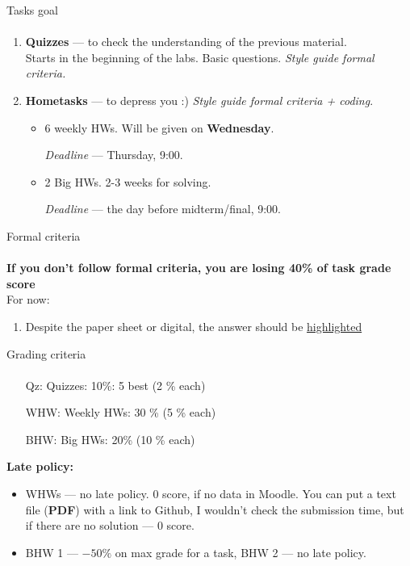 \documentclass[aspectratio=169,xcolor=table,10pt, notes=hide]{beamer}
\begin{document}
\begin{frame}[t]{Tasks goal}
    \framesubtitle{}
    \begin{enumerate}
        \item \textbf{Quizzes} — to check the understanding of the previous material.\\
              Starts in the beginning of the labs. Basic questions. \textit{Style guide formal criteria.}
        \item \textbf{Hometasks} — to depress you :) \textit{Style guide formal criteria + coding}.
        \begin{itemize}
            \item 6 weekly HWs. Will be given on \textbf{Wednesday}. 
            
            \textit{Deadline} --- Thursday, 9:00.
            \item 2 Big HWs. 2-3 weeks for solving. 
            
            \textit{Deadline} --- the day before midterm/final, 9:00.  
        \end{itemize}
    \end{enumerate}
\end{frame}


\begin{frame}[t]{Formal criteria}
    \framesubtitle{}
    \textbf{If you don’t follow formal criteria, you are losing 40\% of task grade score}
    \\For now:
    \begin{enumerate}
        \item Despite the paper sheet or digital, the answer should be \underline{highlighted}
    \end{enumerate}
\end{frame}

\begin{frame}[t]{Grading criteria}
    \framesubtitle{}
    \begin{itemize}
        \item[Qz:] Quizzes: 10\%: 5 best (2 \% each)
        \item[WHW:] Weekly HWs: 30 \% (5 \% each)
        \item[BHW:] Big HWs: 20\% (10 \% each) 
    \end{itemize}
    \textbf{Late policy:}
    \begin{itemize}
        \item WHWs --- no late policy. 0 score, if no data in Moodle. You can put a text file (\textbf{PDF}) with a link to Github, I wouldn't check the submission time, but if there are no solution --- 0 score.
        \item BHW 1 --- $-50\%$ on max grade for a task, BHW 2 --- no late policy.
    \end{itemize}
\end{frame}
\end{document}
